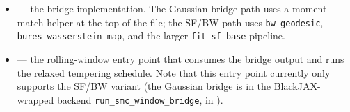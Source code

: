 \begin{itemize}
  \item {} --- the bridge implementation.
        The Gaussian-bridge path uses a moment-match helper at the
        top of the file; the SF/BW path uses
        \texttt{bw\_geodesic}, \texttt{bures\_wasserstein\_map}, and
        the larger \texttt{fit\_sf\_base} pipeline.
  \item {}
        --- the rolling-window entry point that consumes the bridge
        output and runs the relaxed tempering schedule. Note that
        this entry point currently only supports the SF/BW variant
        (the Gaussian bridge is in the BlackJAX-wrapped backend
        \texttt{run\_smc\_window\_bridge}, in
        ).
\end{itemize}
